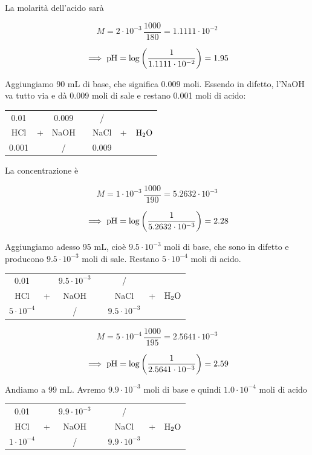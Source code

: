 La molarità dell'acido sarà

$$M=2 \cdot 10^{-3} \, \frac{1000}{180}=1.1111 \cdot 10^{-2}$$

$$\implies \rm pH = \log \left( \frac{1}{1.1111 \cdot 10^{-2}} \right)=1.95$$


Aggiungiamo 90 mL di base, che significa 0.009 moli. Essendo in difetto, l'NaOH va tutto via e dà 0.009 moli di sale e restano 0.001 moli di acido:

\begin{center}
    \begin{tabular}{ccccccc}
        0.01 &  & 0.009 & & / & &\\
        HCl & + & NaOH & \ce{->} & NaCl & + & $\rm H_2O$\\
        0.001 &  &  / & & 0.009 & &\\
    \end{tabular}
\end{center}

La concentrazione è

$$M=1 \cdot 10^{-3} \, \frac{1000}{190}=5.2632 \cdot 10^{-3}$$

$$\implies \rm pH = \log \left( \frac{1}{5.2632 \cdot 10^{-3}} \right)=2.28$$

Aggiungiamo adesso 95 mL, cioè $9.5 \cdot 10^{-3}$ moli di base, che sono in difetto e producono $9.5 \cdot 10^{-3}$ moli di sale. Restano $5 \cdot 10^{-4}$ moli di acido.

\begin{center}
    \begin{tabular}{ccccccc}
        0.01 &  & $9.5 \cdot 10^{-3}$  & & / & &\\
        HCl & + & NaOH & \ce{->} & NaCl & + & $\rm H_2O$\\
        $5 \cdot 10^{-4}$ &  &  / & & $9.5 \cdot 10^{-3}$ & &\\
    \end{tabular}
\end{center}

$$M=5 \cdot 10^{-4} \, \frac{1000}{195}=2.5641 \cdot 10^{-3}$$

$$\implies \rm pH=\log \left( \frac{1}{2.5641 \cdot 10^{-3}} \right)=2.59$$

Andiamo a 99 mL. Avremo $9.9 \cdot 10^{-3}$ moli di base e quindi $1.0 \cdot 10^{-4}$ moli di acido

\begin{center}
    \begin{tabular}{ccccccc}
        0.01 &  & $9.9 \cdot 10^{-3}$  & & / & &\\
        HCl & + & NaOH & \ce{->} & NaCl & + & $\rm H_2O$\\
        $1 \cdot 10^{-4}$ &  &  / & & $9.9 \cdot 10^{-3}$ & &\\
    \end{tabular}
\end{center}


